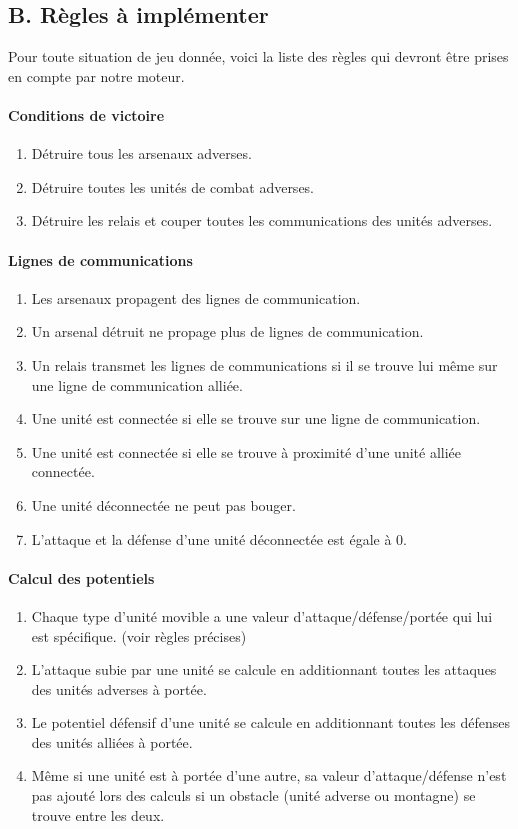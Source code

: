 \documentclass[12pt]{article}
\begin{document}
		\subsection{B. Règles à implémenter}
		Pour toute situation de jeu donnée, voici la liste des règles qui devront être prises en compte par notre moteur.

		\paragraph{Conditions de victoire}
		\begin{enumerate}
		\item Détruire tous les arsenaux adverses.
		\item Détruire toutes les unités de combat adverses.
		\item Détruire les relais et couper toutes les communications des unités adverses.
		\end{enumerate}
		
		\paragraph{Lignes de communications}
		\begin{enumerate}
		\item Les arsenaux propagent des lignes de communication.
		\item Un arsenal détruit ne propage plus de lignes de communication.
		\item Un relais transmet les lignes de communications si il se trouve lui même sur une ligne de communication alliée.
		\item Une unité est connectée si elle se trouve sur une ligne de communication.
		\item Une unité est connectée si elle se trouve à proximité d'une unité alliée connectée.
		\item Une unité déconnectée ne peut pas bouger.
		\item L'attaque et la défense d'une unité déconnectée est égale à 0.
		\end{enumerate}
		
		\paragraph{Calcul des potentiels}
		\begin{enumerate}
		\item Chaque type d'unité movible a une valeur d'attaque/défense/portée qui lui est spécifique. (voir règles précises)
		\item L'attaque subie par une unité se calcule en additionnant toutes les attaques des unités adverses à portée.
		\item Le potentiel défensif d'une unité se calcule en additionnant toutes les défenses des unités alliées à portée.
		\item Même si une unité est à portée d'une autre, sa valeur d'attaque/défense n'est pas ajouté lors des calculs si un obstacle (unité adverse ou montagne) se trouve entre les deux.
		\end{enumerate}
		
\end{document}
